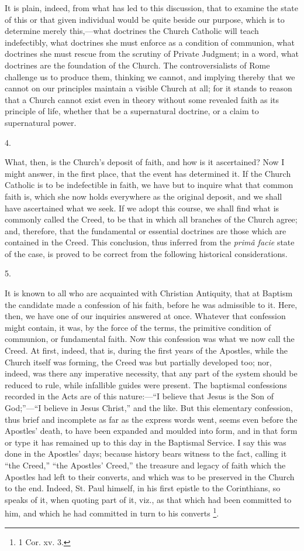 It is plain, indeed, from what has led to this discussion, that to
examine the state of this or that given individual would be quite
beside our purpose, which is to determine merely this,—what
doctrines the Church Catholic will teach indefectibly, what doctrines
she must enforce as a condition of communion, what doctrines she must
rescue from the scrutiny of Private Judgment; in a word, what
doctrines are the foundation of the Church. The controversialists of
Rome challenge us to produce them, thinking we cannot, and implying
thereby that we cannot on our principles maintain a visible Church at
all; for it stands to reason that a Church cannot exist even in theory
without some revealed faith as its principle of life, whether that be
a supernatural doctrine, or a claim to supernatural power.

4.

What, then, is the Church's deposit of faith, and how is it
ascertained? Now I might answer, in the first place, that the event
has determined it. If the Church Catholic is to be indefectible in
faith, we have but to inquire what that common faith is, which she now
holds everywhere as the original deposit, and we shall have
ascertained what we seek. If we adopt this course, we shall find what
is commonly called the Creed, to be that in which all branches of the
Church agree; and, therefore, that the fundamental or essential
doctrines are those which are contained in the Creed. This conclusion,
thus inferred from the \emph{primâ facie} state of the case, is
proved to be correct from the following historical considerations.

5.

It is known to all who are acquainted with Christian Antiquity,
that at Baptism the candidate made a confession of his faith, before
he was admissible to it. Here, then, we have one of our inquiries
answered at once. Whatever that confession might contain, it was, by
the force of the terms, the primitive condition of communion, or
fundamental faith. Now this confession was what we now call the Creed.
At first, indeed, that is, during the first years of the Apostles,
while the Church itself was forming, the Creed was but partially
developed too; nor, indeed, was there any imperative necessity, that
any part of the system should be reduced to rule, while infallible
guides were present. The baptismal confessions recorded in the Acts
are of this nature:—``I believe that Jesus is the Son of
God;''—``I believe in Jesus Christ,'' and the like. But
this elementary confession, thus brief and incomplete as far as the
express words went, seems even before the Apostles' death, to have
been expanded and moulded into form, and in that form or type it has
remained up to this day in the Baptismal Service. I say this was done
in the Apostles' days; because history bears witness to the fact,
calling it ``the Creed,'' ``the Apostles' Creed,'' the
treasure and legacy of faith which the Apostles had left to their
converts, and which was to be preserved in the Church to the end.
Indeed, St. Paul himself, in his first epistle to the Corinthians, so
speaks of it, when quoting part of it, viz., as that which had been
committed to him, and which he had committed in turn to his converts \footnote{1 Cor. xv. 3.}.

